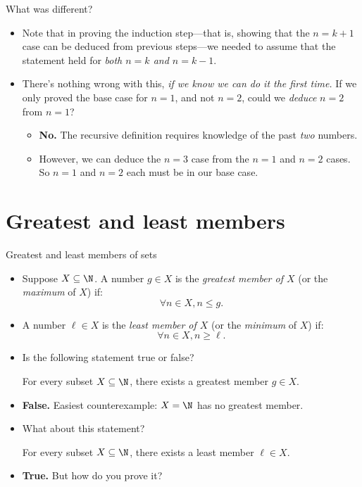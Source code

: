 \documentclass[11pt,aspectratio=1610,handout]{beamer}
\begin{document}
\begin{frame}{What was different?} \p
	\begin{itemize}\itemsep5mm
		\item Note that in proving the induction step---that is, showing that the $n=k+1$ case can be deduced from previous steps---we needed to assume that the statement held for \emph{both $n=k$ and $n=k-1$}. \p
		
		\item There's nothing wrong with this, \emph{if we know we can do it the first time.} If we only proved the base case for $n=1$, and not $n=2$, could we \emph{deduce} $n=2$ from $n=1$? \p
		\begin{itemize}
			\item \textbf{No.} The recursive definition requires knowledge of the past \emph{two} numbers. 
			\item However, we can deduce the $n=3$ case from the $n=1$ and $n=2$ cases. So $n=1$ and $n=2$ each must be in our base case. 
		\end{itemize}
	\end{itemize}
\end{frame}


\section{Greatest and least members}

\begin{frame}{Greatest and least members of sets}
	\begin{itemize}
		\item Suppose $X \subseteq \N$. A number $g \in X$ is the \emph{greatest member of $X$} (or the \emph{maximum} of $X$) if: 
		\[
		\forall n \in X, n \leq g.
		\] \p
		\item A number $\ell \in X$ is the \emph{least member of $X$} (or the \emph{minimum} of $X$) if: 
		\[
		\forall n \in X, n \geq \ell. 
		\]\p
		\item Is the following statement true or false? 
		\begin{center}
			\hspace{-0.2in}	For every subset $X \subseteq \N$, there exists a greatest member $g \in X$. 
		\end{center}\p 
		\item \textbf{False.} Easiest counterexample: $X = \N$ has no greatest member. 
		\item What about this statement? 
		\begin{center}
			For every subset $X \subseteq \N$, there exists a least member $\ell \in X$.
		\end{center}\p 
		\item \textbf{True.} But how do you prove it? 
	\end{itemize}
\end{frame}
\end{document}
